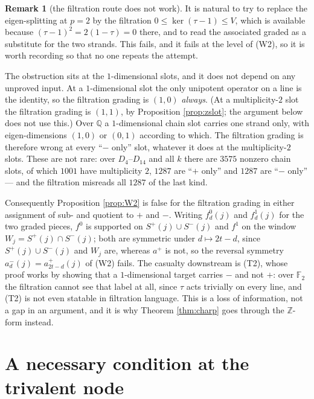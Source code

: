 \documentclass[reqno]{amsart}
\theoremstyle{plain}
\theoremstyle{definition}
\newtheorem{remark}[theorem]{Remark}
\begin{document}
\begin{remark}[the filtration route does not work]\label{rem:filtfail}
It is natural to try to replace the eigen-splitting at $p=2$ by the filtration
$0\le\ker(\tau-1)\le V$, which is available because
$(\tau-1)^2=2(1-\tau)=0$ there, and to read the associated graded as a
substitute for the two strands.  This fails, and it fails at the level of
(W2), so it is worth recording so that no one repeats the attempt.

The obstruction sits at the $1$-dimensional slots, and it does not depend on
any unproved input.  At a $1$-dimensional slot the only unipotent operator on
a line is the identity, so the filtration grading is $(1,0)$ \emph{always}.
(At a multiplicity-$2$ slot the filtration grading is $(1,1)$, by
Proposition \ref{prop:zslot}; the argument below does not use this.)  Over $\mathbb{Q}$ a
$1$-dimensional chain slot carries one
strand only, with eigen-dimensions $(1,0)$ or $(0,1)$ according to which.  The
filtration grading is therefore wrong at every ``$-$ only'' slot, whatever it
does at the multiplicity-$2$ slots.  These are not
rare: over $D_4$--$D_{14}$ and all $k$ there are $3575$ nonzero chain slots, of
which $1001$ have multiplicity $2$, $1287$ are ``$+$ only'' and $1287$ are
``$-$ only'' --- and the filtration misreads all $1287$ of the last kind.

Consequently Proposition \ref{prop:W2} is false for the filtration grading in
either assignment of sub- and quotient to $+$ and $-$.  Writing $f^0_d(j)$ and
$f^1_d(j)$ for the two graded pieces, $f^0$ is supported on
$S^{+}(j)\cup S^{-}(j)$ and $f^1$ on the window
$W_j=S^{+}(j)\cap S^{-}(j)$; both are symmetric under
$d\mapsto2t-d$, since $S^{+}(j)\cup S^{-}(j)$ and $W_j$ are, whereas
$a^{+}$ is not, so the reversal symmetry $a^{-}_d(j)=a^{+}_{2t-d}(j)$ of (W2)
fails.  The casualty downstream is (T2), whose proof works by
showing that a $1$-dimensional target carries $-$ and not $+$: over
$\mathbb{F}_2$ the filtration cannot see that label at all, since $\tau$ acts
trivially on every line, and (T2) is not even statable in filtration language.
This is a loss of information, not a gap in an argument, and it is why
Theorem \ref{thm:charp} goes through the $\mathbb{Z}$-form instead.
\end{remark}

\section{A necessary condition at the trivalent node}\label{sec:nodeone}
\end{document}
